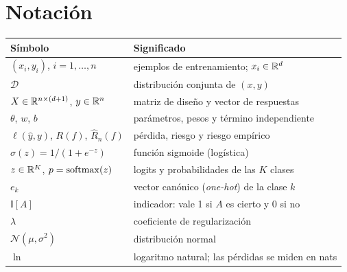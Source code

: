 \documentclass[11pt,a4paper,twoside,openany]{book}
\newcommand{\N}{\mathcal{N}}
\newcommand{\D}{\mathcal{D}}
\newcommand{\ind}{\mathbb{I}}
\newcommand{\Remp}{\widehat{R}_n}
\begin{document}
\section*{Notación}
\begin{center}
\begin{tabular}{@{}ll@{}}
\toprule
Símbolo & Significado \\
\midrule
$(x_i,y_i)$, $i=1,\dots,n$ & ejemplos de entrenamiento; $x_i\in\mathbb{R}^{d}$ \\
$\D$ & distribución conjunta de $(x,y)$ \\
$X\in\mathbb{R}^{n\times(d+1)}$, $y\in\mathbb{R}^{n}$ & matriz de diseño y vector de respuestas \\
$\theta$, $w$, $b$ & parámetros, pesos y término independiente \\
$\ell(\hat y,y)$, $R(f)$, $\Remp(f)$ & pérdida, riesgo y riesgo empírico \\
$\sigma(z)=1/(1+e^{-z})$ & función sigmoide (logística) \\
$z\in\mathbb{R}^{K}$, $p=\operatorname{softmax}(z)$ & logits y probabilidades de las $K$ clases \\
$e_k$ & vector canónico (\emph{one-hot}) de la clase $k$ \\
$\ind[A]$ & indicador: vale 1 si $A$ es cierto y 0 si no \\
$\lambda$ & coeficiente de regularización \\
$\N(\mu,\sigma^{2})$ & distribución normal \\
$\ln$ & logaritmo natural; las pérdidas se miden en nats \\
\bottomrule
\end{tabular}
\end{center}


\tableofcontents

\mainmatter







\backmatter

\end{document}
